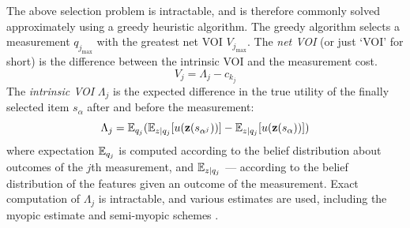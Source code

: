 The above selection problem is intractable, and is therefore commonly solved
approximately using a greedy heuristic algorithm. The greedy algorithm
selects a measurement $q_{j_{\max}}$ with the greatest net VOI
$V_{j_{\max}}$. The {\it net VOI} (or just `VOI' for short) is the
difference between the intrinsic VOI and the measurement cost.
\begin{equation}
\label{eq:greedy-net-value}
V_j = \Lambda_j -c_{k_j}
\end{equation}
The {\it intrinsic VOI} $\Lambda_j$ is the expected
difference in the true utility of the finally selected item $s_\alpha$
after and before the measurement:
\begin{equation}
\label{eq:greedy-intrinsic-value}
\Lambda_j = \mathbb{E}_{q_j}(\mathbb{E}_{z|q_j}[u(\textbf{z}(s_{\alpha^j}))]-\mathbb{E}_{z|q_j}[u(\textbf{z}(s_\alpha))])
\end{equation}
where expectation $\mathbb{E}_{q_j}$ is computed according to the belief
distribution about outcomes of the $j$th measurement, and
$\mathbb{E}_{z|q_j}$ --- according to the belief distribution of the features
given an outcome of the measurement. Exact computation of $\Lambda_j$
is intractable, and various estimates are used, including the myopic
estimate \cite{Russell.right} and semi-myopic schemes
\cite{TolpinShimony.blinkered}.

